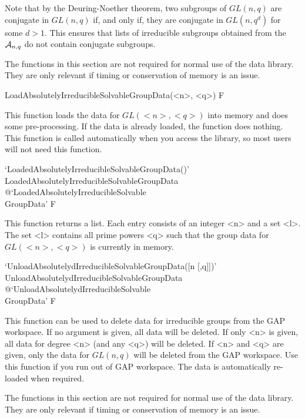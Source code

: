 Note that by the Deuring-Noether theorem, two subgroups of $GL(n, q)$ are
conjugate in $GL(n, q)$ if, and only if, they are conjugate in $GL(n, q^d)$
for some $d > 1$. This ensures that lists of irreducible subgroups obtained
from the ${\cal A}_{n,q}$ do not contain conjugate subgroups. 




The functions in this section are not required for normal use of the data library.
They are only relevant if timing or conservation of memory is an issue.

\>LoadAbsolutelyIrreducibleSolvableGroupData(<n>, <q>) F

This function loads the data for $GL(<n>, <q>)$ into memory and does some pre-processing. If the data
is already loaded, the function does nothing. This function is called automatically when you access the
{\IRREDSOL} library, so most users  will not need this function.

\>`LoadedAbsolutelyIrreducibleSolvableGroupData()'%
{LoadedAbsolutelyIrreducibleSolvableGroupData}%
@{`LoadedAbsolutelyIrreducibleSolvable\\GroupData'} F

This function returns a list. Each entry consists of an integer <n> and a set <l>. The set
<l> contains all prime powers <q> such that the group data for $GL(<n>, <q>)$ is currently in memory.

\>`UnloadAbsolutelydIrreducibleSolvableGroupData([n [,q]])'%
{UnloadAbsolutelydIrreducibleSolvableGroupData}%
@{`UnloadAbsolutelydIrreducibleSolvable\\GroupData'} F

This function can be used to delete data for irreducible groups from the GAP workspace. If no argument
is given, all data will be deleted. If only <n> is given, all data for degree <n> (and any <q>) will
be deleted. If <n> and <q> are given, only the data for $GL(n, q)$ will be deleted from the GAP
workspace. Use this function if you run out of GAP workspace. The
data is automatically re-loaded when required.



The functions in this section are not required for normal use of the data library.
They are only relevant if timing or conservation of memory is an issue.

